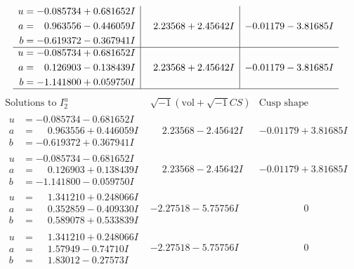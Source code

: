 \documentclass[1p]{elsarticle_modified}
\theoremstyle{definition}
\newcommand{\I}{\sqrt{-1}}
\begin{document}
$$\begin{array}{c|c|c}
\begin{aligned}
u &= -0.085734 + 0.681652 I \\
a &= \phantom{-}0.963556 - 0.446059 I \\
b &= -0.619372 - 0.367941 I\end{aligned}
 & \phantom{-}2.23568 + 2.45642 I & -0.01179 - 3.81685 I \\ \hline\begin{aligned}
u &= -0.085734 + 0.681652 I \\
a &= \phantom{-}0.126903 - 0.138439 I \\
b &= -1.141800 + 0.059750 I\end{aligned}
 & \phantom{-}2.23568 + 2.45642 I & -0.01179 - 3.81685 I\\
 \hline 
 \end{array}$$\newpage$$\begin{array}{c|c|c}  
\text{Solutions to }I^u_{2}& \I (\text{vol} + \sqrt{-1}CS) & \text{Cusp shape}\\
 \hline 
\begin{aligned}
u &= -0.085734 - 0.681652 I \\
a &= \phantom{-}0.963556 + 0.446059 I \\
b &= -0.619372 + 0.367941 I\end{aligned}
 & \phantom{-}2.23568 - 2.45642 I & -0.01179 + 3.81685 I \\ \hline\begin{aligned}
u &= -0.085734 - 0.681652 I \\
a &= \phantom{-}0.126903 + 0.138439 I \\
b &= -1.141800 - 0.059750 I\end{aligned}
 & \phantom{-}2.23568 - 2.45642 I & -0.01179 + 3.81685 I \\ \hline\begin{aligned}
u &= \phantom{-}1.341210 + 0.248066 I \\
a &= \phantom{-}0.352859 - 0.409330 I \\
b &= \phantom{-}0.589078 + 0.533839 I\end{aligned}
 & -2.27518 - 5.75756 I & \phantom{-0.000000 } 0 \\ \hline\begin{aligned}
u &= \phantom{-}1.341210 + 0.248066 I \\
a &= \phantom{-}1.57949 - 0.74710 I \\
b &= \phantom{-}1.83012 - 0.27573 I\end{aligned}
 & -2.27518 - 5.75756 I & \phantom{-0.000000 } 0 \\ \hline\begin{aligned}

\end{aligned}
\end{array}$$
\end{document}
